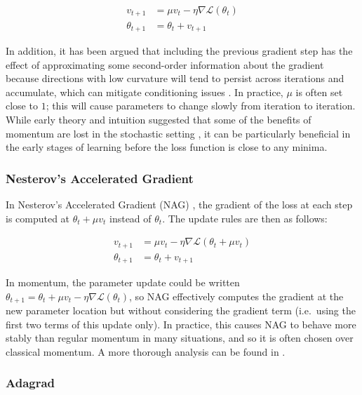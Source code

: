 \begin{align}
v_{t + 1} &= \mu v_t - \eta \nabla \mathcal{L}(\theta_t) \\
\theta_{t + 1} &= \theta_t + v_{t+1}
\end{align}

In addition, it has been argued that including the previous gradient step has the effect of approximating some second-order information about the gradient because directions with low curvature will tend to persist across iterations and accumulate, which can mitigate conditioning issues \cite{}.
In practice, $\mu$ is often set close to $1$; this will cause parameters to change slowly from iteration to iteration.
While early theory and intuition suggested that some of the benefits of momentum are lost in the stochastic setting \cite{}, it can be particularly beneficial in the early stages of learning before the loss function is close to any minima.

\subsubsection{Nesterov's Accelerated Gradient}

In Nesterov's Accelerated Gradient (NAG) \cite{}, the gradient of the loss at each step is computed at $\theta_t + \mu v_t$ instead of $\theta_t$.  The update rules are then as follows:

\begin{align}
v_{t + 1} &= \mu v_t - \eta \nabla\mathcal{L}(\theta_t + \mu v_t) \\
\theta_{t + 1} &= \theta_t + v_{t+1}
\end{align}

In momentum, the parameter update could be written $\theta_{t + 1} = \theta_t + \mu v_t - \eta \nabla \mathcal{L}(\theta_t)$, so NAG effectively computes the gradient at the new parameter location but without considering the gradient term (i.e.\ using the first two terms of this update only).
In practice, this causes NAG to behave more stably than regular momentum in many situations, and so it is often chosen over classical momentum.
A more thorough analysis can be found in \cite{}.

\subsubsection{Adagrad}

